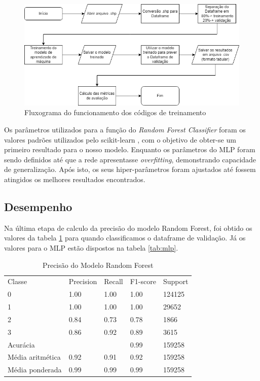 \begin{figure}[H]
	\centering
	\begin{minipage}{0.98\linewidth}
		\centering
		\includegraphics[width=\linewidth]{tg1/figuras/fluxograma_gfed.png}
		\caption{Fluxograma do funcionamento dos códigos de treinamento} \label{fig:rfflux}
	\end{minipage}
\end{figure}

Os parâmetros utilizados para a função do \textit{Random Forest Classifier} foram os valores padrões utilizados pelo scikit-learn \cite{sklearnrfc}, com o objetivo de obter-se um primeiro resultado para o nosso modelo. Enquanto os parâmetros do MLP foram sendo definidos até que a rede apresentasse \textit{overfitting}, demonstrando capacidade de generalização. Após isto, os seus hiper-parâmetros foram ajustados até fossem atingidos os melhores resultados encontrados.

\subsection{Desempenho}

Na última etapa de calculo da precisão do modelo Random Forest, foi obtido os
valores da tabela \ref{tab:rf} para quando classificamos o dataframe de validação. Já os valores para o MLP estão dispostos na tabela \ref{tab:mlp}.

\begin{table}[H]
\centering
\caption{Precisão do Modelo Random Forest}
\label{tab:rf}
\begin{tabular}{lllll}
Classe           & Precision & Recall & F1-score & Support \\
0                & 1.00      & 1.00   & 1.00     & 124125  \\
1                & 1.00      & 1.00   & 1.00     & 29652   \\
2                & 0.84      & 0.73   & 0.78     & 1866    \\
3                & 0.86      & 0.92   & 0.89     & 3615    \\  \cline{1-1}
Acurácia         &           &        & 0.99     & 159258  \\
Média aritmética & 0.92      & 0.91   & 0.92     & 159258  \\
Média ponderada  & 0.99      & 0.99   & 0.99     & 159258 
\end{tabular}
\end{table}

